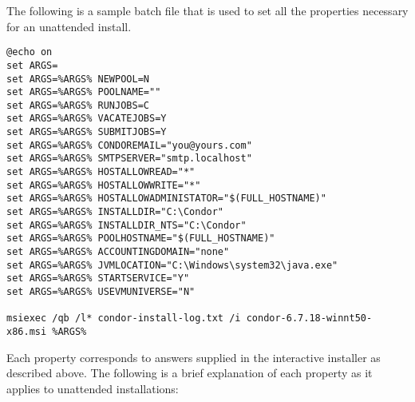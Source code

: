 The following is a sample batch file that is used to set all the
properties necessary for an unattended install.

\begin{verbatim}
@echo on
set ARGS=
set ARGS=%ARGS% NEWPOOL=N
set ARGS=%ARGS% POOLNAME=""
set ARGS=%ARGS% RUNJOBS=C
set ARGS=%ARGS% VACATEJOBS=Y
set ARGS=%ARGS% SUBMITJOBS=Y
set ARGS=%ARGS% CONDOREMAIL="you@yours.com"
set ARGS=%ARGS% SMTPSERVER="smtp.localhost"
set ARGS=%ARGS% HOSTALLOWREAD="*"
set ARGS=%ARGS% HOSTALLOWWRITE="*"
set ARGS=%ARGS% HOSTALLOWADMINISTATOR="$(FULL_HOSTNAME)"
set ARGS=%ARGS% INSTALLDIR="C:\Condor"
set ARGS=%ARGS% INSTALLDIR_NTS="C:\Condor"
set ARGS=%ARGS% POOLHOSTNAME="$(FULL_HOSTNAME)"
set ARGS=%ARGS% ACCOUNTINGDOMAIN="none"
set ARGS=%ARGS% JVMLOCATION="C:\Windows\system32\java.exe"
set ARGS=%ARGS% STARTSERVICE="Y"
set ARGS=%ARGS% USEVMUNIVERSE="N"

msiexec /qb /l* condor-install-log.txt /i condor-6.7.18-winnt50-x86.msi %ARGS%
\end{verbatim}

Each property corresponds to answers supplied in the interactive installer
as described above. The following is a brief explanation of each property
as it applies to unattended installations:

